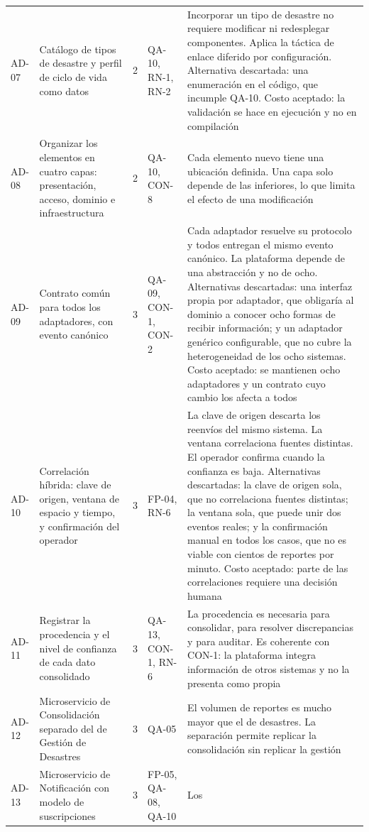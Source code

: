 \documentclass[11pt,letterpaper]{article}
\begin{document}
\begin{longtable}{L{1.15cm} L{3.5cm} L{0.7cm} L{1.9cm} L{8.0cm}}
AD-07 & Catálogo de tipos de desastre y perfil de ciclo de vida como datos & 2 & QA-10, RN-1,
RN-2 & Incorporar un tipo de desastre no requiere modificar ni redesplegar componentes. Aplica la
táctica de enlace diferido por configuración. Alternativa descartada: una enumeración en el código,
que incumple QA-10. Costo aceptado: la validación se hace en ejecución y no en compilación \\
AD-08 & Organizar los elementos en cuatro capas: presentación, acceso, dominio e infraestructura &
2 & QA-10, CON-8 & Cada elemento nuevo tiene una ubicación definida. Una capa solo depende de las
inferiores, lo que limita el efecto de una modificación \\
AD-09 & Contrato común para todos los adaptadores, con evento canónico & 3 & QA-09, CON-1, CON-2 &
Cada adaptador resuelve su protocolo y todos entregan el mismo evento canónico. La plataforma
depende de una abstracción y no de ocho. Alternativas descartadas: una interfaz propia por
adaptador, que obligaría al dominio a conocer ocho formas de recibir información; y un adaptador
genérico configurable, que no cubre la heterogeneidad de los ocho sistemas. Costo aceptado: se
mantienen ocho adaptadores y un contrato cuyo cambio los afecta a todos \\
AD-10 & Correlación híbrida: clave de origen, ventana de espacio y tiempo, y confirmación del
operador & 3 & FP-04, RN-6 & La clave de origen descarta los reenvíos del mismo sistema. La ventana
correlaciona fuentes distintas. El operador confirma cuando la confianza es baja. Alternativas
descartadas: la clave de origen sola, que no correlaciona fuentes distintas; la ventana sola, que
puede unir dos eventos reales; y la confirmación manual en todos los casos, que no es viable con
cientos de reportes por minuto. Costo aceptado: parte de las correlaciones requiere una decisión
humana \\
AD-11 & Registrar la procedencia y el nivel de confianza de cada dato consolidado & 3 & QA-13,
CON-1, RN-6 & La procedencia es necesaria para consolidar, para resolver discrepancias y para
auditar. Es coherente con CON-1: la plataforma integra información de otros sistemas y no la
presenta como propia \\
AD-12 & Microservicio de Consolidación separado del de Gestión de Desastres & 3 & QA-05 & El
volumen de reportes es mucho mayor que el de desastres. La separación permite replicar la
consolidación sin replicar la gestión \\
AD-13 & Microservicio de Notificación con modelo de suscripciones & 3 & FP-05, QA-08, QA-10 & Los

\end{longtable}
\end{document}
